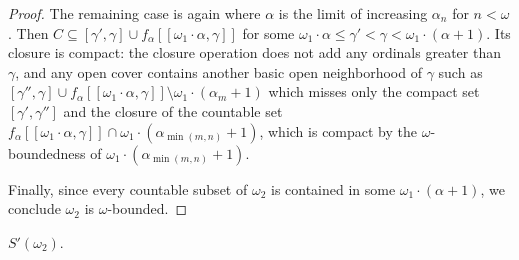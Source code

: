 \documentclass[11pt]{article}
\begin{document}
\begin{proof}
    The remaining case is again where \(\alpha\) is the limit of increasing
    \(\alpha_n\) for \(n<\omega\). Then
    \(
      C
        \subseteq
      [\gamma',\gamma]
        \cup
      f_\alpha[[\omega_1\cdot\alpha,\gamma]]
    \)
    for some \(\omega_1\cdot\alpha\leq\gamma'<\gamma<\omega_1\cdot(\alpha+1)\).
    Its closure is compact:
    the closure operation does not add any ordinals greater than \(\gamma\),
    and any open cover
    contains another basic open neighborhood of \(\gamma\) such as
    \(
      [\gamma'',\gamma]
        \cup
      f_\alpha[[\omega_1\cdot\alpha,\gamma]]
        \setminus
      \omega_1\cdot(\alpha_m+1)
    \)
    which misses only the compact set \([\gamma',\gamma'']\) and the
    closure of the countable set
    \(
      f_\alpha[[\omega_1\cdot\alpha,\gamma]]
        \cap
      \omega_1\cdot(\alpha_{\min(m,n)}+1)
    \), which is compact by the \(\omega\)-boundedness of
    \(\omega_1\cdot(\alpha_{\min(m,n)}+1)\).

    Finally, since every countable subset of \(\omega_2\) is contained in
    some \(\omega_1\cdot(\alpha+1)\), we conclude \(\omega_2\) is
    \(\omega\)-bounded.
  \end{proof}

  \begin{theorem*}
    \(S'(\omega_2)\).
  \end{theorem*}
\end{document}
